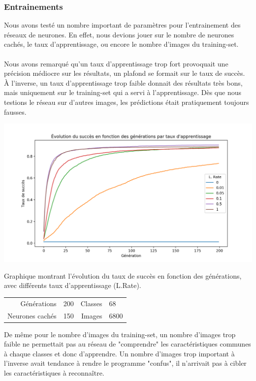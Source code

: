 \documentclass{article}
\begin{document}
\subsubsection{Entrainements}
Nous avons testé un nombre important de paramètres pour l’entrainement des réseaux de neurones. En effet, nous devions jouer sur le nombre de neurones cachés, le taux d’apprentissage, ou encore le nombre d’images du training-set.
\paragraph{}Nous avons remarqué qu’un taux d’apprentissage trop fort provoquait une précision médiocre sur les résultats, un plafond se formait sur le taux de succès. À l’inverse, un taux d’apprentissage trop faible donnait des résultats très bons, mais uniquement sur le training-set qui a servi à l’apprentissage. Dès que nous testions le réseau sur d’autres images, les prédictions était pratiquement toujours fausses. 

\begin{center}
	\includegraphics[scale=0.25]{learningRateGraph.png}
	
	Graphique montrant l'évolution du taux de succès en fonction des générations, avec différents taux d'apprentissage (L.Rate).
	
	\begin{tabular}{r@{: }l r@{: }l}
		Générations & 200 & Classes & 68 \\
		Neurones cachés & 150 & Images & 6800 \\
	\end{tabular}
	
\end{center}

De même pour le nombre d’images du training-set, un nombre d’images trop faible ne permettait pas au réseau de "comprendre" les caractéristiques communes à chaque classes et donc d’apprendre. Un nombre d’images trop important à l’inverse avait tendance à rendre le programme "confus", il n’arrivait pas à cibler les caractéristiques à reconnaître.
\end{document}

